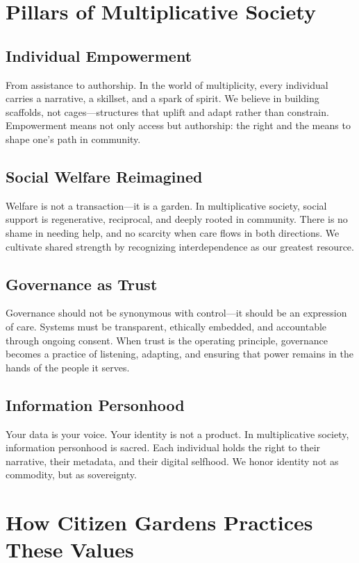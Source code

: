 \documentclass[12pt]{article}
\begin{document}
\section{Pillars of Multiplicative Society}

\subsection{Individual Empowerment}
From assistance to authorship. In the world of multiplicity, every individual carries a narrative, a skillset, and a spark of spirit. We believe in building scaffolds, not cages—structures that uplift and adapt rather than constrain. Empowerment means not only access but authorship: the right and the means to shape one's path in community.

\subsection{Social Welfare Reimagined}
Welfare is not a transaction—it is a garden. In multiplicative society, social support is regenerative, reciprocal, and deeply rooted in community. There is no shame in needing help, and no scarcity when care flows in both directions. We cultivate shared strength by recognizing interdependence as our greatest resource.

\subsection{Governance as Trust}
Governance should not be synonymous with control—it should be an expression of care. Systems must be transparent, ethically embedded, and accountable through ongoing consent. When trust is the operating principle, governance becomes a practice of listening, adapting, and ensuring that power remains in the hands of the people it serves.

\subsection{Information Personhood}
Your data is your voice. Your identity is not a product. In multiplicative society, information personhood is sacred. Each individual holds the right to their narrative, their metadata, and their digital selfhood. We honor identity not as commodity, but as sovereignty.

\section{How Citizen Gardens Practices These Values}
\end{document}
